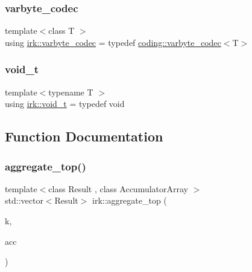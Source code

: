 \subsubsection{\texorpdfstring{varbyte\+\_\+codec}{varbyte\_codec}}
{\footnotesize\ttfamily template$<$class T $>$ \\
using \mbox{\hyperlink{namespaceirk_a9ce0dc691e62f8bbf0578ea3d778d18d}{irk\+::varbyte\+\_\+codec}} = typedef \mbox{\hyperlink{structirk_1_1coding_1_1varbyte__codec}{coding\+::varbyte\+\_\+codec}}$<$T$>$}

\mbox{\label{namespaceirk_a8b44ecf42d719b2badcf5e7c86899918}} 
\subsubsection{\texorpdfstring{void\+\_\+t}{void\_t}}
{\footnotesize\ttfamily template$<$typename T $>$ \\
using \mbox{\hyperlink{namespaceirk_a8b44ecf42d719b2badcf5e7c86899918}{irk\+::void\+\_\+t}} = typedef void}



\subsection{Function Documentation}
\mbox{\label{namespaceirk_a068256b1f4dd5e0025e793d6d93b6896}} 
\subsubsection{\texorpdfstring{aggregate\+\_\+top()}{aggregate\_top()}}
{\footnotesize\ttfamily template$<$class Result , class Accumulator\+Array $>$ \\
std\+::vector$<$Result$>$ irk\+::aggregate\+\_\+top (\begin{DoxyParamCaption}\item[{std\+::size\+\_\+t}]{k,  }\item[{const Accumulator\+Array \&}]{acc }\end{DoxyParamCaption})}

\mbox{\label{namespaceirk_ae79f958d4bca4bb9e05628261f2fb725}} 
